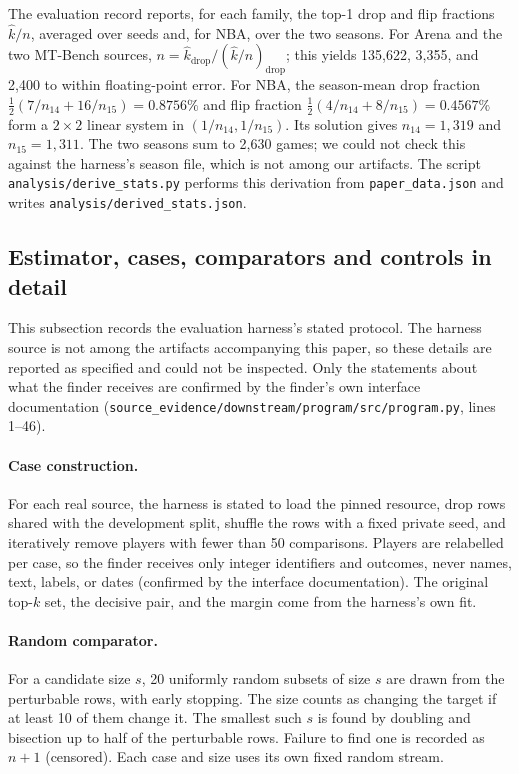 \documentclass{article}
\newcommand{\kver}{\hat{k}}
\begin{document}
The evaluation record reports, for each family, the top-1 drop and flip fractions $\kver/n$, averaged over seeds and, for NBA, over the two seasons. For Arena and the two MT-Bench sources, $n=\kver_{\text{drop}}/(\kver/n)_{\text{drop}}$; this yields 135,622, 3,355, and 2,400 to within floating-point error. For NBA, the season-mean drop fraction $\tfrac12(7/n_{14}+16/n_{15})=0.8756\%$ and flip fraction $\tfrac12(4/n_{14}+8/n_{15})=0.4567\%$ form a $2\times2$ linear system in $(1/n_{14},1/n_{15})$. Its solution gives $n_{14}=1{,}319$ and $n_{15}=1{,}311$. The two seasons sum to 2,630 games; we could not check this against the harness's season file, which is not among our artifacts. The script \nolinkurl{analysis/derive_stats.py} performs this derivation from \texttt{paper\_data.json} and writes \nolinkurl{analysis/derived_stats.json}.

\subsection{Estimator, cases, comparators and controls in detail}
\label{app:details}

This subsection records the evaluation harness's stated protocol. The harness source is not among the artifacts accompanying this paper, so these details are reported as specified and could not be inspected. Only the statements about what the finder receives are confirmed by the finder's own interface documentation (\nolinkurl{source_evidence/downstream/program/src/program.py}, lines 1--46).

\paragraph{Case construction.}
For each real source, the harness is stated to load the pinned resource, drop rows shared with the development split, shuffle the rows with a fixed private seed, and iteratively remove players with fewer than 50 comparisons. Players are relabelled per case, so the finder receives only integer identifiers and outcomes, never names, text, labels, or dates (confirmed by the interface documentation). The original top-$k$ set, the decisive pair, and the margin come from the harness's own fit.

\paragraph{Random comparator.}
For a candidate size $s$, 20 uniformly random subsets of size $s$ are drawn from the perturbable rows, with early stopping. The size counts as changing the target if at least 10 of them change it. The smallest such $s$ is found by doubling and bisection up to half of the perturbable rows. Failure to find one is recorded as $n+1$ (censored). Each case and size uses its own fixed random stream.
\end{document}
